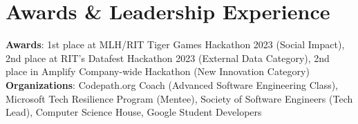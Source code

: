 \documentclass[letterpaper,11pt]{article}
\begin{document}
\section{Awards \& Leadership Experience}
 \begin{itemize}[leftmargin=0.15in, label={}]
    \small{\item{
      \textbf{Awards}{: 1st place at MLH/RIT Tiger Games Hackathon 2023 (Social Impact), 2nd place at RIT's Datafest Hackathon 2023 (External Data Category), 2nd place in Amplify Company-wide Hackathon (New Innovation Category)
} \\
    \textbf{Organizations}{: Codepath.org Coach (Advanced Software Engineering Class), Microsoft Tech Resilience Program (Mentee), Society of Software Engineers (Tech Lead), Computer Science House, Google Student Developers
} \\
    }}
 \end{itemize}



\end{document}
